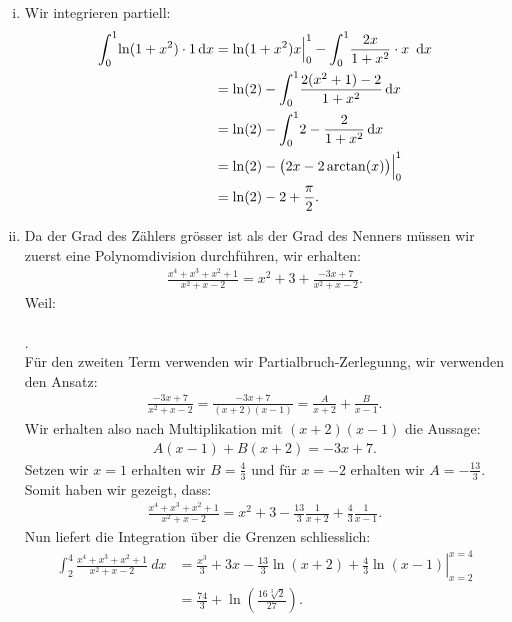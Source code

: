 \documentclass[a4paper, 20]{exam}
\begin{document}
\begin{solution}
\begin{enumerate}[i.)]
\item
Wir integrieren partiell:
\begin{equation}
\begin{aligned}
\int_{0}^1 \! \ln(1+x^2) \cdot 1\, \mathrm{d}x &= \ln(1+x^2)x \Big|^1_0 - \int_{0}^1 \! \frac{2x}{1+x^2}\cdot x~ \, \mathrm{d}x \\
&= \ln(2) - \int_{0}^1 \! \frac{2(x^2+1)-2}{1+x^2} \, \mathrm{d}x\\
&= \ln(2) - \int_{0}^1 \!2- \frac{2}{1+x^2} \, \mathrm{d}x\\
&= \ln(2) - \big( 2x-2\arctan(x) \big) \Big|^1_0\\
&= \ln(2)-2+\frac{\pi}{2} .
\notag
\end{aligned}
\end{equation}

\item Da der Grad des Zählers grösser ist als der Grad des Nenners müssen wir zuerst eine Polynomdivision durchführen, wir erhalten: 
\begin{align*}
\frac{x^4+x^3+x^2+1}{x^2+x-2} = x^2 + 3 + \frac{-3x+7}{x^2+x-2}.
\end{align*}
Weil:  \\ \\ 
.
\\
Für den zweiten Term verwenden wir Partialbruch-Zerlegunng, wir verwenden den Ansatz:
\begin{align*}
\frac{-3x+7}{x^2+x-2}= \frac{-3x+7}{(x+2)(x-1)} = \frac{A}{x+2} + \frac{B}{x-1}.
\end{align*}
Wir erhalten also nach Multiplikation mit $(x+2)(x-1)$ die Aussage:
\begin{align*}
A(x-1)+B(x+2)=-3x+7.
\end{align*}
Setzen wir $x=1$ erhalten wir $B= \frac{4}{3}$ und für $x=-2$ erhalten wir $A= - \frac{13}{3}$. 
Somit haben wir gezeigt, dass:
\begin{align*}
\frac{x^4+x^3+x^2+1}{x^2+x-2}= x^2 + 3 - \frac{13}{3} \frac{1}{x+2} + \frac{4}{3} \frac{1}{x-1}.
\end{align*}
Nun liefert die Integration über die Grenzen schliesslich:
\begin{align*}
\int_2^4  \frac{x^4+x^3+x^2+1}{x^2+x-2}~dx &= \left. \frac{x^3}{3} + 3x - \frac{13}{3} \ln (x+2)+ \frac{4}{3} \ln ( x-1) \right|_{x=2}^{x=4} \\ 
&= \frac{74}{3} + \ln \left( \frac{16 \sqrt[3]{2}}{27} \right).
\end{align*}
\end{enumerate}
\end{solution}
\end{document}
